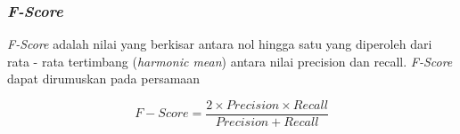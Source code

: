 \subsubsection{\textit{F-Score}}

\textit{F-Score} adalah nilai yang berkisar antara nol hingga satu yang diperoleh dari rata - rata tertimbang (\textit{harmonic mean}) antara nilai precision dan recall. \textit{F-Score} dapat dirumuskan pada persamaan \parencite{Deng2016}

\begin{equation}
    \label{eq:perofrmaFScore}
    F{-}Score = \frac{2 \times {Precision} \times {Recall}}{{Precision} + {Recall}}
\end{equation}











